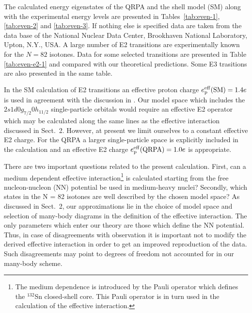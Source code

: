 The calculated energy eigenstates of the QRPA and the shell model (SM) along
with the experimental energy levels are presented in Tables\ \ref{tab:even-1}, 
\ref{tab:even-2} and \ref{tab:even-3}. If nothing else is specified data 
are taken from the data base of the National Nuclear Data Center, Brookhaven
National Laboratory, Upton, N.Y., USA.
A large number of E2 transitions are experimentally
known for the $N = 82$ isotones. Data for some selected transitions are 
presented in Table \ref{tab:even-e2-1} and compared with our theoretical 
predictions. Some E3 trasitions are also presented in the same table.

In the SM calculation of E2 transitions an effective proton charge 
$e_{\rm p}^{\rm eff}({\rm SM}) = 1.4e$ is used in 
agreement with the discussion in \cite{boh63}. 
Our model space which includes the 
$2s1d0g_{7/2}0h_{11/2}$ single-particle orbitals
would require an 
effective E2 operator which may be calculated along the same lines
as the effective interaction discussed 
in Sect.~2. However, at present we
limit ourselves to a constant effective E2 charge. For the QRPA 
a larger single-particle space is explicitly included in the  calculation
and an  effective E2 charge $e_{\rm p}^{\rm eff}({\rm QRPA}) = 1.0e$ 
is appropriate.

There are two important questions related to the present calculation.
First, can a medium dependent
effective interaction\footnote{The medium dependence is introduced 
by the Pauli operator which defines the $^{132}$Sn closed-shell core.
This Pauli operator is in turn used in the calculation of the
effective interaction.}  is calculated starting
from the free nucleon-nucleon (NN)
potential
be used in medium-heavy nuclei? Secondly, which states in the N = 82
isotones are well described by the chosen model space?
As discussed in Sect.\ 2, our approximations lie in the choice of
model space and selection of many-body diagrams in
the definition of the effective interaction.
The only parameters which enter our theory are those 
which define the NN potential. 
Thus, in case of disagreements with observation it is important
not to modify the derived effective interaction
in order to get an improved reproduction of the data. 
Such disagreements may point to degrees of freedom not accounted for 
in our many-body scheme.  


